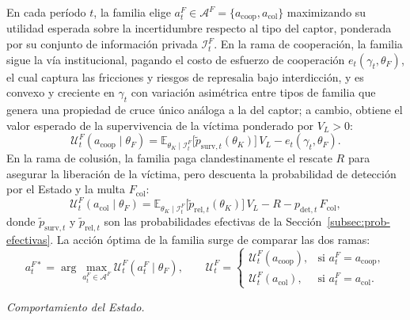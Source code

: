 \documentclass[pdflatex,sn-mathphys-ay]{sn-jnl}
\theoremstyle{thmstyleone}
\theoremstyle{thmstyletwo}
\theoremstyle{thmstylethree}
\newcommand{\E}{\mathbb{E}}
\newcommand{\1}{\mathbf{1}}
\begin{document}
\noindent En cada período $t$, la familia elige $a_t^F\in\mathcal{A}^F=\{a_{\mathrm{coop}},a_{\mathrm{col}}\}$ maximizando su utilidad esperada sobre la incertidumbre respecto al tipo del captor, ponderada por su conjunto de información privada $\mathcal{I}_t^F$. En la rama de cooperación, la familia sigue la vía institucional, pagando el costo de esfuerzo de cooperación $e_t(\gamma_t,\theta_F)$, el cual captura las fricciones y riesgos de represalia bajo interdicción, y es convexo y creciente en $\gamma_t$ con variación asimétrica entre tipos de familia que genera una propiedad de cruce único análoga a la del captor; a cambio, obtiene el valor esperado de la supervivencia de la víctima ponderado por $V_L>0$:
\begin{equation}
\mathcal{U}^F_t(a_{\mathrm{coop}}\mid\theta_F)=\E_{\theta_K\mid\mathcal{I}_t^F}\!\bigl[\tilde{p}_{\mathrm{surv},t}(\theta_K)\bigr]\,V_L-e_t(\gamma_t,\theta_F).
\label{eq:f-coop}
\end{equation}
En la rama de colusión, la familia paga clandestinamente el rescate $R$ para asegurar la liberación de la víctima, pero descuenta la probabilidad de detección por el Estado y la multa $F_{\mathrm{col}}$:
\begin{equation}
\mathcal{U}^F_t(a_{\mathrm{col}}\mid\theta_F)=\E_{\theta_K\mid\mathcal{I}_t^F}\!\bigl[\tilde{p}_{\mathrm{rel},t}(\theta_K)\bigr]\,V_L-R-p_{\mathrm{det},t}\,F_{\mathrm{col}},
\label{eq:f-col}
\end{equation}
donde $\tilde{p}_{\mathrm{surv},t}$ y $\tilde{p}_{\mathrm{rel},t}$ son las probabilidades efectivas de la Sección~\ref{subsec:prob-efectivas}. La acción óptima de la familia surge de comparar las dos ramas:
\begin{equation}
a_t^{F\ast}=\arg\max_{a_t^F\in\mathcal{A}^F}\mathcal{U}^F_t(a_t^F\mid\theta_F),\qquad
\mathcal{U}^F_t=\begin{cases}\mathcal{U}^F_t(a_{\mathrm{coop}}), & \text{si }a_t^F=a_{\mathrm{coop}},\\\mathcal{U}^F_t(a_{\mathrm{col}}), & \text{si }a_t^F=a_{\mathrm{col}}.\end{cases}
\label{eq:f-argmax}
\end{equation}

\noindent\textit{Comportamiento del Estado.}
\end{document}
